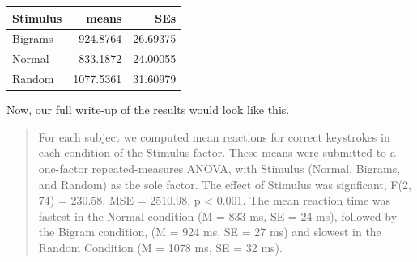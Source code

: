 \documentclass[]{book}
\newenvironment{Shaded}{\begin{snugshade}}{\end{snugshade}}
\newcommand{\KeywordTok}[1]{\textcolor[rgb]{0.13,0.29,0.53}{\textbf{{#1}}}}
\newcommand{\DataTypeTok}[1]{\textcolor[rgb]{0.13,0.29,0.53}{{#1}}}
\newcommand{\DecValTok}[1]{\textcolor[rgb]{0.00,0.00,0.81}{{#1}}}
\newcommand{\StringTok}[1]{\textcolor[rgb]{0.31,0.60,0.02}{{#1}}}
\newcommand{\NormalTok}[1]{{#1}}
\theoremstyle{definition}
\theoremstyle{definition}
\theoremstyle{definition}
\theoremstyle{remark}
\begin{document}
\begin{Shaded}
\end{Shaded}

\begin{tabular}{l|r|r}
\hline
Stimulus & means & SEs\\
\hline
Bigrams & 924.8764 & 26.69375\\
\hline
Normal & 833.1872 & 24.00055\\
\hline
Random & 1077.5361 & 31.60979\\
\hline
\end{tabular}

Now, our full write-up of the results would look like this.

\begin{quote}
For each subject we computed mean reactions for correct keystrokes in
each condition of the Stimulus factor. These means were submitted to a
one-factor repeated-measures ANOVA, with Stimulus (Normal, Bigrams, and
Random) as the sole factor. The effect of Stimulus was signficant, F(2,
74) = 230.58, MSE = 2510.98, p \textless{} 0.001. The mean reaction time
was fastest in the Normal condition (M = 833 ms, SE = 24 ms), followed
by the Bigram condition, (M = 924 ms, SE = 27 ms) and slowest in the
Random Condition (M = 1078 ms, SE = 32 ms).
\end{quote}
\end{document}
